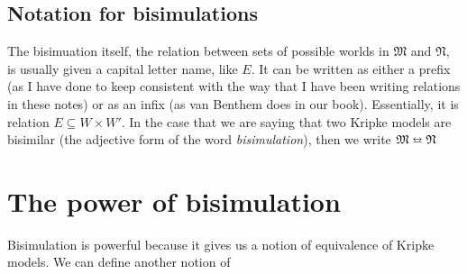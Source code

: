 \setcounter{subsection}{-1}

\subsection{Notation for bisimulations}
The bisimuation itself, the relation between sets of possible worlds in $\mathfrak{M}$ and $\mathfrak{N}$, is usually given a 
capital letter name, like $E$. It can be written as either a prefix (as I have done to keep consistent with the way that I
have been writing relations in these notes) or as an infix (as van Benthem does in our book). Essentially, it is relation
$E \subseteq W \times W'$. In the case that we are saying that two Kripke models are bisimilar (the adjective form of the word
\emph{bisimulation}), then we write $\mathfrak{M} \leftrightarroweq \mathfrak{N}$

\section{The power of bisimulation}
Bisimulation is powerful because it gives us a notion of equivalence of Kripke models. We can define another notion of 
